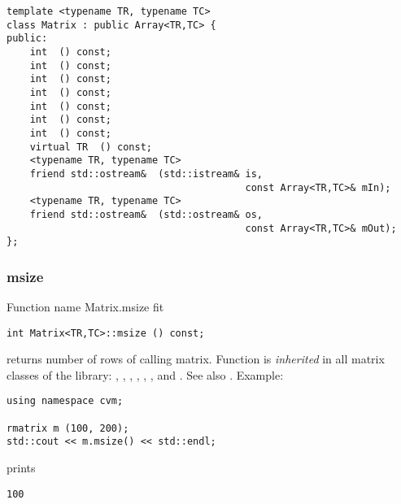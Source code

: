 \bigskip
\noindent%
\verb"template <typename TR, typename TC>"\\
\verb"class Matrix : public Array<TR,TC> {"\\
\verb"public:"\\
\verb"    int "\verb" () const;"\\
\verb"    int "\verb" () const;"\\
\verb"    int "\verb" () const;"\\
\verb"    int "\verb" () const;"\\
\verb"    int "\verb" () const;"\\
\verb"    int "\verb" () const;"\\
\verb"    int "\verb" () const;"\\
\verb"    virtual TR "\verb" () const;"\\
\verb"    <typename TR, typename TC>"\\
\verb"    friend std::ostream& "\verb" (std::istream& is,"\\
\verb"                                         const Array<TR,TC>& mIn);"\\
\verb"    <typename TR, typename TC>"\\
\verb"    friend std::ostream& "\verb" (std::ostream& os,"\\
\verb"                                         const Array<TR,TC>& mOut);"\\
\verb"};"
\newpage


\subsubsection{msize}
Function%
\pdfdest name {Matrix.msize} fit
\begin{verbatim}
int Matrix<TR,TC>::msize () const;
\end{verbatim}
returns  number of rows of  calling matrix.
Function is \emph{inherited} in all matrix classes
of the library:
,   ,
, ,
, ,
 and .
See also .
Example:
\begin{Verbatim}
using namespace cvm;

rmatrix m (100, 200);
std::cout << m.msize() << std::endl;
\end{Verbatim}
prints
\begin{Verbatim}
100
\end{Verbatim}
\newpage



